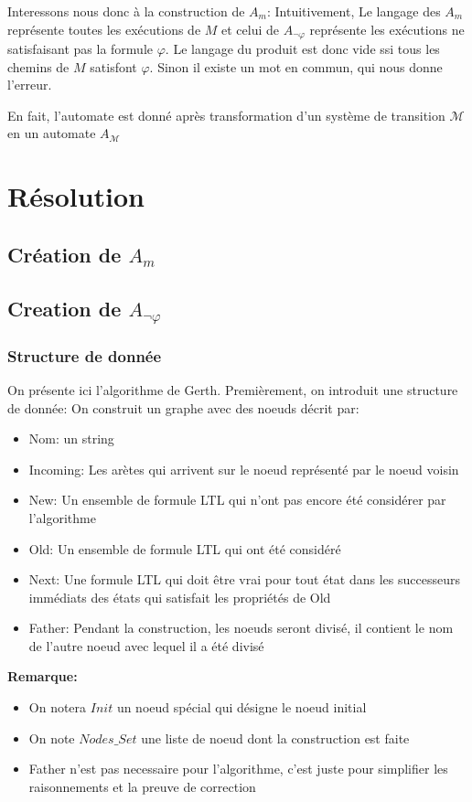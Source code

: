 \documentclass{paper}
\begin{document}
    Interessons nous donc à la construction de $A_m$: Intuitivement, Le langage des $A_m$ représente toutes les exécutions de $M$ et celui de $A_{\lnot\varphi}$ représente les exécutions ne satisfaisant pas la 
    formule $\varphi$. Le langage du produit est donc vide ssi tous les chemins de $M$ satisfont $\varphi$. Sinon il existe un mot en commun, qui nous donne l'erreur.

    En fait,  l'automate est donné après transformation d'un système de transition $\mathcal{M}$ en un automate $A_{\mathcal{M}}$
\section{Résolution}

\subsection{Création de $A_m$}


\subsection{Creation de $A_{\lnot\varphi}$}
    \subsubsection{Structure de donnée}
    On présente ici l'algorithme de Gerth.
    Premièrement, on introduit une structure de donnée: 
    On construit un graphe avec des noeuds décrit par:
    \begin{itemize}
        \item Nom: un string
        \item Incoming: Les arètes qui arrivent sur le noeud représenté par le noeud voisin
        \item New: Un ensemble de formule LTL qui n'ont pas encore été considérer par l'algorithme
        \item Old: Un ensemble de formule LTL qui ont été considéré
        \item Next: Une formule LTL qui doit être vrai pour tout état dans les successeurs immédiats des états qui satisfait les propriétés de Old
        \item Father: Pendant la construction, les noeuds seront divisé, il contient le nom de l'autre noeud avec lequel il a été divisé
    \end{itemize}

    \textbf{Remarque:}
    \begin{itemize}
        \item On notera $Init$ un noeud spécial qui désigne le noeud initial
        \item On note $Nodes\_Set$ une liste de noeud dont la construction est faite 
        \item Father n'est pas necessaire pour l'algorithme, c'est juste pour simplifier les raisonnements et la preuve de correction
    \end{itemize} 
    
\end{document}
